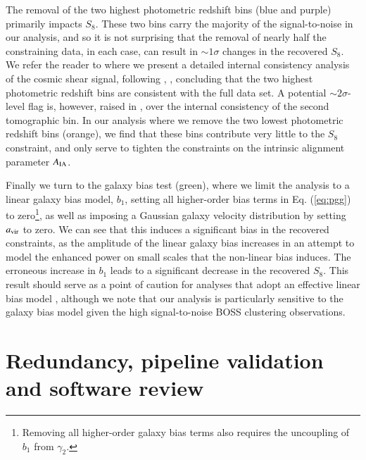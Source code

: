 \begin{appendix}
The removal of the two highest photometric redshift bins (blue and purple) primarily impacts $S_8$.   
These two bins carry the majority of the signal-to-noise in our analysis, and so it is not surprising that the removal of nearly half the constraining data, in each case, can result in $\sim 1 \sigma$ changes in the recovered $S_8$.   
We refer the reader to \citet{asgari/etal:inprep} where we present a detailed internal consistency analysis of the cosmic shear signal, following \citet{kohlinger/etal:2019}, \citep[see also][]{efstathiou/lemos:2018},  concluding that the two highest photometric redshift bins are consistent with the full data set.   
A potential $\sim 2\sigma$-level flag is, however, raised in \citet{asgari/etal:inprep}, 
over the internal consistency of the second tomographic bin.  
In our analysis where we remove the two lowest photometric redshift bins (orange), we find that these bins contribute very little to the $S_8$ constraint, and only serve to tighten the constraints on the intrinsic alignment parameter $A_{\rm IA}$.

Finally we turn to the galaxy bias test (green), where we limit the analysis to a linear galaxy bias model, $b_1$, setting all higher-order bias terms in Eq. (\ref{eq:pgg}) to zero\footnote{Removing all higher-order galaxy bias terms also requires the uncoupling of $b_1$ from $\gamma_2$.}, as well as imposing a Gaussian galaxy velocity distribution by setting $a_{\rm vir}$ to zero.   
We can see that this induces a significant bias in the recovered constraints, as the amplitude of the linear galaxy bias increases in an attempt to model the enhanced power on small scales that the non-linear bias induces.   
The erroneous increase in $b_1$ leads to a significant decrease in the recovered $S_8$.  This result should serve as a point of caution for \tttp analyses that adopt an effective linear bias model \citep[see also the discussion in][]{asgari/etal:2020}, although we note that our analysis is particularly sensitive to the galaxy bias model given the high signal-to-noise BOSS clustering observations.


\section{Redundancy, pipeline validation and software review}
\label{app:codereview}


\end{appendix}
